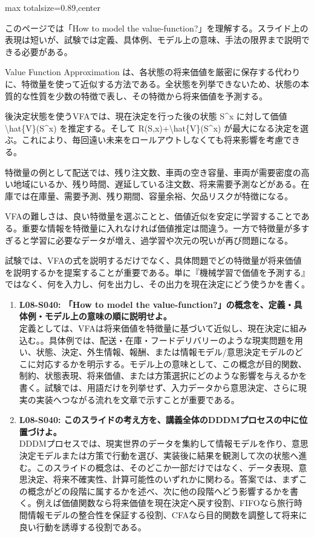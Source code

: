 \begin{minipage}[t]{0.58\textwidth}
\begin{adjustbox}{max totalsize={\textwidth}{0.89\textheight},center}
\begin{minipage}{\textwidth}\scriptsize
{}このページでは「How to model the value-function?」を理解する。スライド上の表現は短いが、試験では定義、具体例、モデル上の意味、手法の限界まで説明できる必要がある。\par
Value Function Approximation は、各状態の将来価値を厳密に保存する代わりに、特徴量を使って近似する方法である。全状態を列挙できないため、状態の本質的な性質を少数の特徴で表し、その特徴から将来価値を予測する。\par
後決定状態を使うVFAでは、現在決定を行った後の状態 S\textasciicircum{}x に対して価値 \textbackslash{}hat\{V\}(S\textasciicircum{}x) を推定する。そして R(S,x)+\textbackslash{}hat\{V\}(S\textasciicircum{}x) が最大になる決定を選ぶ。これにより、毎回遠い未来をロールアウトしなくても将来影響を考慮できる。\par
特徴量の例として配送では、残り注文数、車両の空き容量、車両が需要密度の高い地域にいるか、残り時間、遅延している注文数、将来需要予測などがある。在庫では在庫量、需要予測、残り期間、容量余裕、欠品リスクが特徴になる。\par
VFAの難しさは、良い特徴量を選ぶことと、価値近似を安定に学習することである。重要な情報を特徴量に入れなければ価値推定は間違う。一方で特徴量が多すぎると学習に必要なデータが増え、過学習や次元の呪いが再び問題になる。\par
試験では、VFAの式を説明するだけでなく、具体問題でどの特徴量が将来価値を説明するかを提案することが重要である。単に『機械学習で価値を予測する』ではなく、何を入力し、何を出力し、その出力を現在決定にどう使うかを書く。\par{}\begin{enumerate}\item \textbf{L08-S040: 「How to model the value-function?」の概念を、定義・具体例・モデル上の意味の順に説明せよ。}\\定義としては、VFAは将来価値を特徴量に基づいて近似し、現在決定に組み込む。。具体例では、配送・在庫・フードデリバリーのような現実問題を用い、状態、決定、外生情報、報酬、または情報モデル/意思決定モデルのどこに対応するかを明示する。モデル上の意味として、この概念が目的関数、制約、状態表現、将来価値、または方策選択にどのような影響を与えるかを書く。試験では、用語だけを列挙せず、入力データから意思決定、さらに現実の実装へつながる流れを文章で示すことが重要である。\item \textbf{L08-S040: このスライドの考え方を、講義全体のDDDMプロセスの中に位置づけよ。}\\DDDMプロセスでは、現実世界のデータを集約して情報モデルを作り、意思決定モデルまたは方策で行動を選び、実装後に結果を観測して次の状態へ進む。このスライドの概念は、そのどこか一部だけではなく、データ表現、意思決定、将来不確実性、計算可能性のいずれかに関わる。答案では、まずこの概念がどの段階に属するかを述べ、次に他の段階へどう影響するかを書く。例えば価値関数なら将来価値を現在決定へ戻す役割、FIFOなら旅行時間情報モデルの整合性を保証する役割、CFAなら目的関数を調整して将来に良い行動を誘導する役割である。\end{enumerate}

\end{minipage}
\end{adjustbox}
\end{minipage}
